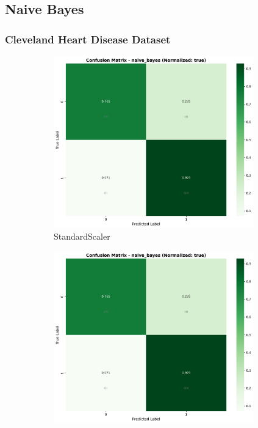 \FloatBarrier

\subsection{Naive Bayes}\label{subsec:nb}

\subsubsection{Cleveland Heart Disease Dataset}\label{subsubsec:nb-cleveland}

\begin{figure}[H]\centering
\begin{subfigure}[b]{0.31\textwidth}\centering
\includegraphics[width=0.95\textwidth]{Result/cleveland_dataset/confusion_matrices/naive_bayes_numeric_dataset_StandardScaler.png}
\caption{StandardScaler}\label{fig:nb_clev_cm_standard}
\end{subfigure}\hfill
\begin{subfigure}[b]{0.31\textwidth}\centering
\includegraphics[width=0.95\textwidth]{Result/cleveland_dataset/confusion_matrices/naive_bayes_numeric_dataset_MinMaxScaler.png}

\end{subfigure}
\end{figure}
